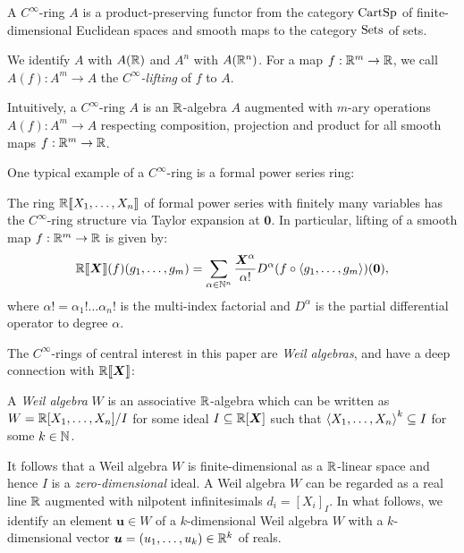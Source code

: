 \begin{definition}
  A \emph{$C^\infty$}-ring $A$ is a product-preserving functor from the category $\mathord{\mathrm{CartSp}}$ of finite-dimensional Euclidean spaces and smooth maps to the category $\mathord{\mathrm{Sets}}$ of sets.

  We identify $A$ with $A(\mathbb{R})$ and $A^n$ with $A(\mathbb{R}^n)$.
  For a map $f: \mathbb{R}^m \to \mathbb{R}$, we call $A(f): A^m \to A$ the \emph{$C^\infty$-lifting} of $f$ to $A$.
\end{definition}

Intuitively, a $C^\infty$-ring $A$ is an $\mathbb{R}$-algebra $A$ augmented with $m$-ary operations $A(f): A^m \to A$ respecting composition, projection and product for all smooth maps $f: \mathbb{R}^m \to \mathbb{R}$.

One typical example of a $C^\infty$-ring is a formal power series ring:

\begin{theorem}\label{thm:series-is-smooth}
  The ring $\mathbb{R}\llbracket X_1, \dots, X_n\rrbracket$ of formal power series with finitely many variables has the $C^\infty$-ring structure via Taylor expansion at $\boldsymbol{0}$.
  In particular, lifting of a smooth map $f: \mathbb{R}^m \to \mathbb{R}$ is given by:
  \[
    \mathord{\mathbb{R}\llbracket\boldsymbol{X}\rrbracket}(f)(g_1, \dots, g_m) = \sum_{\alpha \in \mathbb{N}^n} \frac{\boldsymbol{X}^\alpha}{\alpha!} D^\alpha(f \circ \braket{g_1, \dots, g_m})(\boldsymbol{0}),
  \]
  where $\alpha! = \alpha_1 ! \dots \alpha_n !$ is the multi-index factorial and $D^\alpha$ is the partial differential operator to degree $\alpha$.
\end{theorem}

The $C^\infty$-rings of central interest in this paper are \emph{Weil algebras}, and have a deep connection with $\mathord{\mathbb{R}\llbracket\boldsymbol{X}\rrbracket}$:

\begin{definition}
  A \emph{Weil algebra} $W$ is an associative $\mathbb{R}$-algebra which can be written as $W = \mathbb{R}[X_1, \dots, X_n]/I$ for some ideal $I \subseteq \mathbb{R}[\boldsymbol{X}]$ such that $\braket{X_1, \dots, X_n}^k \subseteq I$ for some $k \in \mathbb{N}$.
\end{definition}
It follows that a Weil algebra $W$ is finite-dimensional as a $\mathbb{R}$-linear space and hence $I$ is a \emph{zero-dimensional} ideal.
A Weil algebra $W$ can be regarded as a real line $\mathbb{R}$ augmented with nilpotent infinitesimals $d_i = {[X_i]}_I$.
In what follows, we identify an element $\boldsymbol{u} \in W$ of a $k$-dimensional Weil algebra $W$ with a $k$-dimensional vector $\boldsymbol{u} = (u_1, \dots, u_k) \in \mathbb{R}^k$ of reals.

